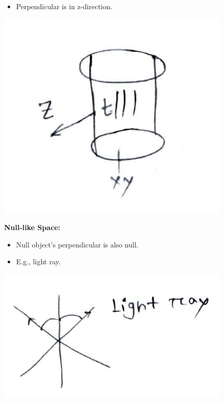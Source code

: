 \documentclass[14pt]{article} %
\begin{document}
\begin{tcolorbox}[ title=Post-class discussions]
\begin{figure}[H]
\begin{minipage}[t]{0.6\textwidth}
        \begin{itemize}
            \item Perpendicular is in z-direction.
        \end{itemize}
    \end{minipage}%
    \hfill
    \begin{minipage}[t]{0.35\textwidth}
        \includegraphics[width=\linewidth]{figures/L5_4.jpeg}
    \end{minipage}
    \begin{minipage}[t]{0.6\textwidth}
    \vspace{-3cm}
        \textbf{Null-like Space:}
        \begin{itemize}
            \item Null object's perpendicular is also null.
            \item E.g., light ray.
        \end{itemize}
    \end{minipage}%
    \hfill
    \begin{minipage}[t]{0.35\textwidth}
        \includegraphics[width=\linewidth]{figures/L5_6.jpeg}
    \end{minipage}

\end{figure}
\end{tcolorbox}
\newpage
\end{document}
